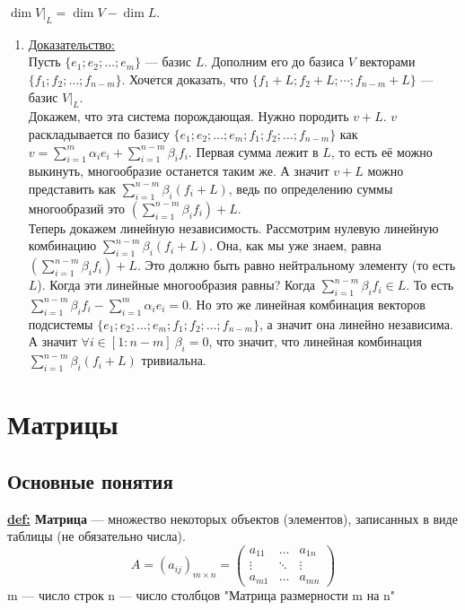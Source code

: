 \documentclass[twoside]{book}
\newcommand{\prooff}[1]{{\underline{Доказательство:}} \\ }
\begin{document}
$\dim V\big|_L=\dim V-\dim L$.
\begin{enumerate}
    \item[] \prooff{}
          Пусть $\{e_1;e_2;\ldots;e_m\}$ --- базис $L$. Дополним его до базиса $V$ векторами $\{f_1;f_2;\ldots;f_{n-m}\}$. Хочется доказать, что $\{f_1+L;f_2+L;\cdots;f_{n-m}+L\}$ --- базис $V\big|_L$.\\
          Докажем, что эта система порождающая. Нужно породить $v+L$. $v$ раскладывается по базису $\{e_1;e_2;\ldots;e_m;f_1;f_2;\ldots;f_{n-m}\}$ как $v=\sum\limits_{i=1}^m\alpha_ie_i+\sum\limits_{i=1}^{n-m}\beta_if_i$. Первая сумма лежит в $L$, то есть её можно выкинуть, многообразие останется таким же. А значит $v+L$ можно представить как $\sum\limits_{i=1}^{n-m}\beta_i(f_i+L)$, ведь по определению суммы многообразий это $\left(\sum\limits_{i=1}^{n-m}\beta_if_i\right)+L$.\\
          Теперь докажем линейную независимость. Рассмотрим нулевую линейную комбинацию $\sum\limits_{i=1}^{n-m}\beta_i(f_i+L)$. Она, как мы уже знаем, равна $\left(\sum\limits_{i=1}^{n-m}\beta_if_i\right)+L$. Это должно быть равно нейтральному элементу (то есть $L$). Когда эти линейные многообразия равны? Когда $\sum\limits_{i=1}^{n-m}\beta_if_i\in L$. То есть $\sum\limits_{i=1}^{n-m}\beta_if_i-\sum\limits_{i=1}^{m}\alpha_ie_i=0$. Но это же линейная комбинация векторов подсистемы $\{e_1;e_2;\ldots;e_m;f_1;f_2;\ldots;f_{n-m}\}$, а значит она линейно независима. А значит $\forall i\in[1:n-m]~\beta_i=0$, что значит, что линейная комбинация $\sum\limits_{i=1}^{n-m}\beta_i(f_i+L)$ тривиальна.
\end{enumerate}



\section{Матрицы}
\subsection{Основные понятия}
\textbf{\underline{def:} Матрица} --- множество некоторых объектов (элементов), записанных в виде таблицы (не обязательно числа).
\[ A = (a_{ij})_{m \times n} =
    \begin{pmatrix}
        a_{11} & \ldots & a_{1n} \\
        \vdots & \ddots & \vdots \\
        a_{m1} & \ldots & a_{mn}
    \end{pmatrix}\]
m --- число строк
n --- число столбцов
"Матрица размерности m на n"
\end{document}
